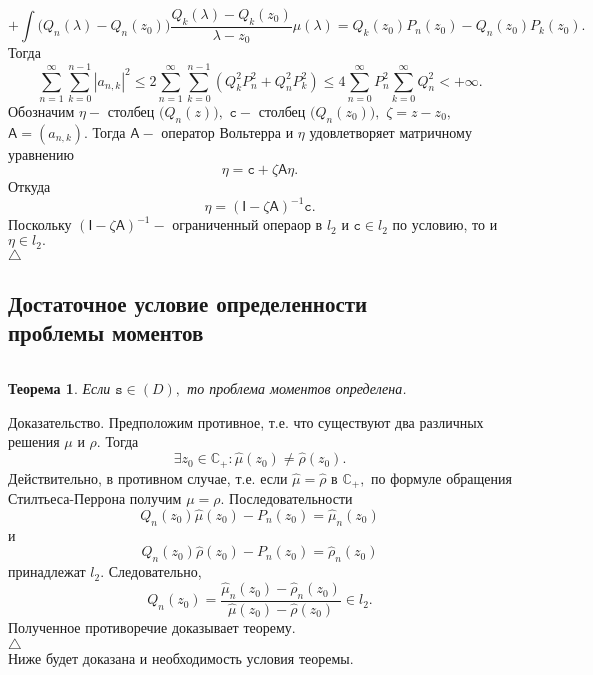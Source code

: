 \documentclass[12pt,a4paper]{article}
\theoremstyle{plain}   \newtheorem{Pro}{Задача}
\newtheorem{The}{Теорема}
\begin{document}
$$
  +\int \biggl ( Q_n (\lambda )-Q_n (z_0 ) \biggr )
  \frac{Q_k (\lambda )-Q_k (z_0 )}{\lambda -z_0 } \mu (\lambda ) =
  Q_k (z_0 )P_n (z_0 ) -Q_n (z_0 )P_k (z_0 ).
$$
Тогда
$$
  \sum _{n=1}^{\infty} \sum _{k=0}^{n-1} |a_{n,k}|^2 \leq
  2 \sum _{n=1}^{\infty}\sum _{k=0}^{n-1}
  (Q_k ^2 P_n ^2 +Q_n ^2 P_k ^2 ) \leq
  4\sum_{n=0}^{\infty} P_n ^2 \sum _{k=0}^{\infty} Q_n ^2
  < +\infty .
$$
Обозначим
$ \mathtt{\eta} - $
столбец
$ \bigl ( Q_n (z) \bigr ) , $
$ \mathtt{c} - $
столбец
$ \bigl ( Q_n (z_0 ) \bigr ) , $
$ \zeta =z-z_0 , $
$ \mathsf{A} = (a_{n,k}). $
Тогда
$ \mathsf{A} - $
оператор Вольтерра и
$ \mathtt{\eta} $
удовлетворяет матричному уравнению
$$
 \mathtt{\eta} =\mathtt{c}+ \zeta \mathsf{A} \mathtt{\eta} .
$$
Откуда
$$
  \mathtt{\eta} = ( \mathsf{I}-\zeta \mathsf{A})^{-1} \mathtt{c} .
$$
Поскольку
$ ( \mathsf{I}-\zeta \mathsf{A})^{-1} - $
ограниченный операор в
$ l_2 $
и
$ \mathtt{c} \in l_2  $
по условию, то и
$ \mathtt{\eta} \in l_2 . $
\\
$ \triangle $
\newpage
\subsection{Достаточное условие определенности \\
проблемы моментов}
$ \; $
\\
\begin{The}
Если
$ \mathtt{s} \in (D) , $
то проблема моментов определена.
\end{The}
{\Large Доказательство.}
Предположим противное, т.е. что существуют два различных решения
$ \mu $
и
$ \rho . $
Тогда
$$
  \exists z_0 \in \mathbb{C}_+ :
  \hat \mu (z_0 ) \not = \hat \rho ( z_0 ) .
$$
Действительно, в противном случае, т.е. если
$ \hat \mu = \hat \rho $
в
$ \mathbb{C}_+ , $
по формуле обращения Стилтьеса-Перрона получим
$ \mu = \rho . $
Последовательности
$$
  Q_n (z_0 )\hat \mu (z_0 )-P_n (z_0 ) = \hat \mu _n (z_0 )
$$
и
$$
  Q_n (z_0 ) \hat \rho ( z_0 ) -P_n (z_0 ) = \hat \rho _n (z_0 )
$$
принадлежат
$ l_2 . $
Следовательно,
$$
  Q_n (z_0 ) =\frac{\hat \mu _n (z_0 ) - \hat \rho _n ( z_0 ) }
  {\hat \mu (z_0 ) -\hat \rho (z_0 )} \in l_2 .
$$
Полученное противоречие доказывает теорему.
\\
$ \triangle $
\\
Ниже будет доказана и необходимость условия теоремы.
\newpage
\end{document}
